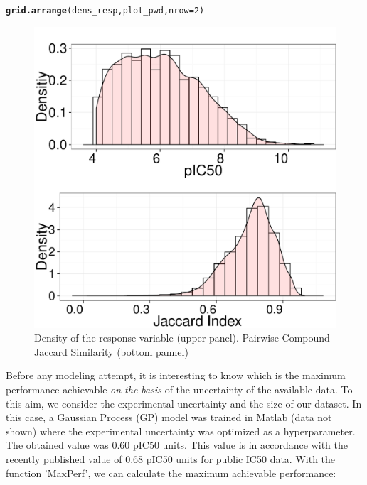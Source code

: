 \documentclass[twoside,a4wide,12pt]{article}\usepackage[]{graphicx}\usepackage[]{color}
\makeatletter
\def\maxwidth{ %
  \ifdim\Gin@nat@width>\linewidth
    \linewidth
  \else
    \Gin@nat@width
  \fi
}
\newcommand{\hlnum}[1]{\textcolor[rgb]{0.686,0.059,0.569}{#1}}%
\newcommand{\hlstd}[1]{\textcolor[rgb]{0.345,0.345,0.345}{#1}}%
\newcommand{\hlkwc}[1]{\textcolor[rgb]{0.333,0.667,0.333}{#1}}%
\newcommand{\hlkwd}[1]{\textcolor[rgb]{0.737,0.353,0.396}{\textbf{#1}}}%
\newenvironment{kframe}{%
 \def\at@end@of@kframe{}%
 \ifinner\ifhmode%
  \def\at@end@of@kframe{\end{minipage}}%
  \begin{minipage}{\columnwidth}%
 \fi\fi%
 \def\FrameCommand##1{\hskip\@totalleftmargin \hskip-\fboxsep
 \colorbox{shadecolor}{##1}\hskip-\fboxsep
     \hskip-\linewidth \hskip-\@totalleftmargin \hskip\columnwidth}%
 \MakeFramed {\advance\hsize-\width
   \@totalleftmargin\z@ \linewidth\hsize
   \@setminipage}}%
 {\par\unskip\endMakeFramed%
 \at@end@of@kframe}
\newenvironment{knitrout}{}{} %
\makeatother
\begin{document}
\begin{knitrout}
\color{fgcolor}\begin{kframe}
\begin{alltt}
\hlkwd{grid.arrange}\hlstd{(dens_resp, plot_pwd,} \hlkwc{nrow} \hlstd{=} \hlnum{2}\hlstd{)}
\end{alltt}
\end{kframe}\begin{figure}[]


{\centering \includegraphics[width=\maxwidth]{figure/unnamed-chunk-25} 

}

\caption[Density of the response variable (upper panel)]{Density of the response variable (upper panel). Pairwise Compound Jaccard Similarity (bottom pannel)\label{fig:unnamed-chunk-25}}
\end{figure}


\end{knitrout}


Before any modeling attempt, it is interesting to know which is the maximum performance achievable {\it on the basis} of the uncertainty of the available data.\cite{cortesGP}
To this aim, we consider the experimental uncertainty and the size of our dataset. 
In this case, a Gaussian Process (GP) model was trained in Matlab (data not shown) where the experimental uncertainty was optimized as a hyperparameter. The obtained value was 0.60 pIC50 units.
This value is in accordance with the recently published value of 0.68 pIC50 units for public IC50 data.\cite{kramerIC50}
With the function 'MaxPerf', we can calculate the maximum achievable performance:
\end{document}
